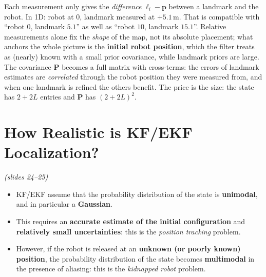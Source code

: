 \documentclass[11pt,a4paper]{article}
\theoremstyle{definition}
\theoremstyle{plain}
\theoremstyle{remark}
\newcommand{\slides}[1]{\par\vspace{-2pt}\noindent\emph{(slides #1)}\par\smallskip}
\begin{document}
\begin{intuition}
Each measurement only gives the \emph{difference} $\bm\ell_i-\bm p$ between a landmark and the robot. In 1D: robot at $0$, landmark measured at $+5.1$\,m. That is compatible with ``robot $0$, landmark $5.1$'' as well as ``robot $10$, landmark $15.1$''. Relative measurements alone fix the \emph{shape} of the map, not its absolute placement; what anchors the whole picture is the \textbf{initial robot position}, which the filter treats as (nearly) known with a small prior covariance, while landmark priors are large. The covariance $\bm P$ becomes a full matrix with cross-terms: the errors of landmark estimates are \emph{correlated} through the robot position they were measured from, and when one landmark is refined the others benefit. The price is the size: the state has $2+2L$ entries and $\bm P$ has $(2+2L)^2$.
\end{intuition}

\section{How Realistic is KF/EKF Localization?}
\slides{24--25}

\begin{itemize}
  \item KF/EKF assume that the probability distribution of the state is \textbf{unimodal}, and in particular a \textbf{Gaussian}.
  \item This requires an \textbf{accurate estimate of the initial configuration} and \textbf{relatively small uncertainties}: this is the \emph{position tracking} problem.
  \item However, if the robot is released at an \textbf{unknown (or poorly known) position}, the probability distribution of the state becomes \textbf{multimodal} in the presence of aliasing: this is the \emph{kidnapped robot} problem.
\end{itemize}
\end{document}
